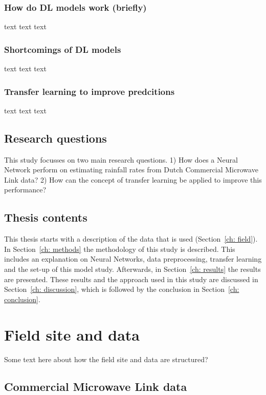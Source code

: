 \documentclass[twocolumn, 10pt, a4paper]{memoir}
\begin{document}
 \subsection{How do DL models work (briefly)}
 text text text
 \subsection{Shortcomings of DL models}
 text text text 
 \subsection{Transfer learning to improve predcitions}
 text text text


\section{Research questions}
This study focusses on two main research questions.
1) How does a Neural Network perform on estimating rainfall rates from Dutch Commercial Microwave Link data?
2) How can the concept of transfer learning be applied to improve this performance?


\section{Thesis contents}
This thesis starts with a description of the data that is used (Section~\ref{ch: field}). In Section~\ref{ch: methods} the methodology of this study is described. This includes an explanation on Neural Networks, data preprocessing, transfer learning and the set-up of this model study. Afterwards, in Section~\ref{ch: results} the results are presented. These results and the approach used in this study are discussed in Section~\ref{ch: discussion}, which is followed by the conclusion in Section~\ref{ch: conclusion}.







\cleardoublepage
\chapter{Field site and data}\vspace{-6mm} 
\label{ch: field}
Some text here about how the field site and data are structured?

\section{Commercial Microwave Link data}
\end{document}
